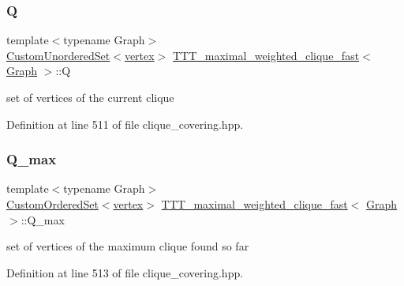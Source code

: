 \subsubsection{\texorpdfstring{Q}{Q}}
{\footnotesize\ttfamily template$<$typename Graph$>$ \\
\hyperlink{classCustomUnorderedSet}{Custom\+Unordered\+Set}$<$\hyperlink{classTTT__maximal__weighted__clique__fast_a55ca1f8931415f7338827925b86c218d}{vertex}$>$ \hyperlink{classTTT__maximal__weighted__clique__fast}{T\+T\+T\+\_\+maximal\+\_\+weighted\+\_\+clique\+\_\+fast}$<$ \hyperlink{structGraph}{Graph} $>$\+::Q\hspace{0.3cm}{\ttfamily [private]}}



set of vertices of the current clique 



Definition at line 511 of file clique\+\_\+covering.\+hpp.

\mbox{\label{classTTT__maximal__weighted__clique__fast_ab721403471abde42379115e117b9e334}} 
\subsubsection{\texorpdfstring{Q\+\_\+max}{Q\_max}}
{\footnotesize\ttfamily template$<$typename Graph$>$ \\
\hyperlink{classCustomOrderedSet}{Custom\+Ordered\+Set}$<$\hyperlink{classTTT__maximal__weighted__clique__fast_a55ca1f8931415f7338827925b86c218d}{vertex}$>$ \hyperlink{classTTT__maximal__weighted__clique__fast}{T\+T\+T\+\_\+maximal\+\_\+weighted\+\_\+clique\+\_\+fast}$<$ \hyperlink{structGraph}{Graph} $>$\+::Q\+\_\+max\hspace{0.3cm}{\ttfamily [private]}}



set of vertices of the maximum clique found so far 



Definition at line 513 of file clique\+\_\+covering.\+hpp.

\mbox{\label{classTTT__maximal__weighted__clique__fast_a1f990403b10caa438cf387b38b3988a0}} 
